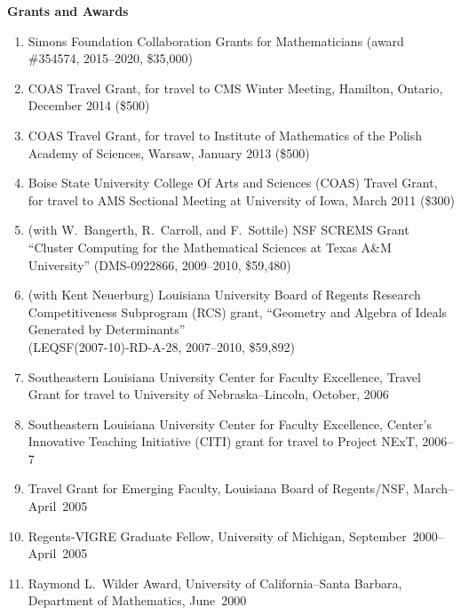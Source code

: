 \documentclass[12pt]{article}
\begin{document}
\textbf{Grants and Awards}
\begin{enumerate}[revarabic]
\item Simons Foundation Collaboration Grants for Mathematicians (award \#354574, 2015--2020, \$35,000)
\item COAS Travel Grant, for travel to CMS Winter Meeting, Hamilton, Ontario, December 2014 (\$500)
\item COAS Travel Grant, for travel to Institute of Mathematics of the Polish Academy of Sciences, Warsaw, January 2013 (\$500)
\item Boise State University College Of Arts and Sciences (COAS) Travel Grant, for travel to AMS Sectional Meeting at University of Iowa, March 2011 (\$300)
\item (with W.~Bangerth, R.~Carroll, and F.~Sottile)
NSF SCREMS Grant ``Cluster Computing for the 
Mathematical Sciences at Texas A\&M University''
(DMS-0922866, 2009--2010, \$59,480)
\item (with Kent Neuerburg)
Louisiana University Board of Regents Research Competitiveness Subprogram (RCS) grant,
``Geometry and Algebra of Ideals Generated by Determinants'' \\
(LEQSF(2007-10)-RD-A-28, 2007--2010, \$59,892)
\item Southeastern Louisiana University Center for Faculty Excellence, Travel Grant for travel to University of Nebraska--Lincoln,
October, 2006
\item Southeastern Louisiana University Center for Faculty Excellence, Center's Innovative Teaching Initiative (CITI) grant
for travel to Project NExT, 2006--7
\item Travel Grant for Emerging Faculty, Louisiana Board of Regents/NSF, 
March--April~2005
\item Regents-VIGRE Graduate Fellow, University of Michigan, 
September~2000--April~2005
\item Raymond L.~Wilder Award, University of California--Santa Barbara,
Department of Mathematics, 
June~2000
\end{enumerate}
\end{document}
